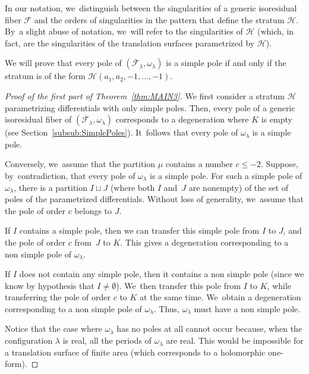 \documentclass[JEP,XML,SOM,Unicode,NoFloatCountersInSection,published]{cedram}
\theoremstyle{definition}
\begin{document}
In our notation, we~distinguish between the singularities of a generic isoresidual fiber $\mathcal{F}$ and the orders of singularities in the pattern that define the stratum $\mathcal{H}$. By~a slight abuse of notation, we~will refer to the singularities of $\mathcal{H}$ (which, in fact, are the singularities of the translation surfaces parametrized by $\mathcal{H}$).

\label{sub:7Simple}

We will prove that every pole of $(\overline{\mathcal{F}}_{\lambda},\omega_{\lambda})$ is a simple pole if and only if the stratum is of the form $\mathcal{H}(a_{1},a_{2},-1,\dots,-1)$.

\begin{proof}[Proof of the first part of Theorem~\ref{thm:MAIN3}]
We first consider a stratum $\mathcal{H}$ parametrizing differentials with only simple poles. Then, every pole of a generic isoresidual fiber of $(\overline{\mathcal{F}}_{\lambda},\omega_{\lambda})$ corresponds to a degeneration where $K$ is empty (see Section~\ref{subsub:SimplePoles}). It~follows that every pole of $\omega_{\lambda}$ is a simple pole.

Conversely, we~assume that the partition $\mu$ contains a number $c \leq -2$. Suppose, by~contradiction, that every pole of $\omega_{\lambda}$ is a simple pole. For such a simple pole of $\omega_{\lambda}$, there is a partition $I \sqcup J$ (where both $I$ and~$J$ are nonempty) of the set of poles of the parametrized differentials. Without loss of generality, we~assume that the pole of order $c$ belongs to $J$.

If $I$ contains a simple pole, then we can transfer this simple pole from $I$ to $J$, and the pole of order $c$ from~$J$ to $K$. This gives a degeneration corresponding to a non simple pole of $\omega_{\lambda}$.

If $I$ does not contain any simple pole, then it contains a non simple pole (since we know by hypothesis that $I \neq \emptyset$). We~then transfer this pole from $I$ to $K$, while transferring the pole of order $c$ to $K$ at the same time. We~obtain a degeneration corresponding to a non simple pole of $\omega_{\lambda}$. Thus, $\omega_{\lambda}$ must have a non simple pole.

Notice that the case where $\omega_{\lambda}$ has no poles at all cannot occur because, when the configuration $\lambda$ is real, all the periods of $\omega_{\lambda}$ are real. This would be impossible for a translation surface of finite area (which corresponds to a holomorphic one-form).
\end{proof}
\end{document}
